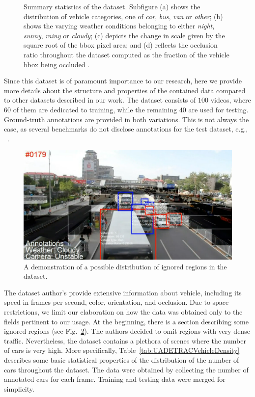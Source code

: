 \begin{figure}[t]
\begin{subfigure}[b]{\uadetracfigsize\textwidth}
        \caption[]{}
    \end{subfigure}
    \caption[ dataset overview]{Summary statistics of the  dataset. Subfigure (a) shows the distribution of vehicle categories, one of \emph{car}, \emph{bus}, \emph{van} or \emph{other}; (b) shows the varying weather conditions belonging to either \emph{night}, \emph{sunny}, \emph{rainy} or \emph{cloudy}; (c) depicts the change in scale given by the square root of the \gls{bbox} pixel area; and (d) reflects the occlusion ratio throughout the dataset computed as the fraction of the vehicle \gls{bbox} being occluded . }
    \label{fig:UADETRACStats}
\end{figure}

Since this dataset is of paramount importance to our research, here we provide more details about the structure and properties of the contained data compared to other datasets described in our work. The dataset consists of $100$ videos, where $60$ of them are dedicated to training, while the remaining $40$ are used for testing. Ground-truth annotations are provided in both variations. This is not always the case, as several benchmarks do not disclose annotations for the test dataset, e.g., ~\cite{Geiger2012CVPR}.

\begin{figure}[t]
    \centerline{\includegraphics[width=0.8\linewidth]{figures/datasets/uadetrac_ignored_regions.png}}
    \caption[Ignored regions in ]{A demonstration of a possible distribution of ignored regions in the  dataset. }
    \label{fig:UADETRACIgnoredRegions}
\end{figure}

The dataset author's provide extensive information about vehicle, including its speed in frames per second, color, orientation, and occlusion. Due to space restrictions, we limit our elaboration on how the data was obtained only to the fields pertinent to our usage. At the beginning, there is a section describing some ignored regions (see Fig.~\ref{fig:UADETRACIgnoredRegions}). The authors decided to omit regions with very dense traffic. Nevertheless, the dataset contains a plethora of scenes where the number of cars is very high. More specifically, Table~\ref{tab:UADETRACVehicleDensity} describes some basic statistical properties of the distribution of the number of cars throughout the dataset. The data were obtained by collecting the number of annotated cars for each frame. Training and testing data were merged for simplicity.

